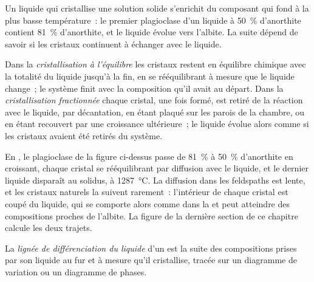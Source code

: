 Un liquide qui cristallise une solution solide s'enrichit du composant qui fond à la plus
basse température~: le premier plagioclase d'un liquide à \qty{50}{\percent} d'anorthite
contient \qty{81}{\percent} d'anorthite, et le liquide évolue vers l'albite. La suite dépend
de savoir si les cristaux continuent à échanger avec le
liquide.

\begin{definition}
\label{def:b2:magmatic-differentiation:crystallisation}
Dans la \emph{cristallisation à l'équilibre} les
cristaux restent en équilibre chimique avec la totalité du liquide jusqu'à la
fin, en se rééquilibrant à mesure que le liquide change~; le système finit avec la composition
qu'il avait au départ. Dans la \emph{cristallisation fractionnée}
chaque cristal, une fois formé, est retiré de la réaction avec le liquide, par
décantation, en étant plaqué sur les parois de la chambre, ou en étant recouvert par une
croissance ultérieure~; le liquide évolue alors comme si les cristaux avaient été retirés du
système.
\end{definition}

En , le plagioclase de la figure ci-dessus passe de
\qty{81}{\percent} à \qty{50}{\percent} d'anorthite en croissant, chaque cristal se rééquilibrant par
diffusion avec le liquide, et le dernier liquide disparaît au solidus, à
\qty{1287}{\celsius}. La diffusion dans les feldspaths est lente, et les cristaux naturels
la suivent rarement~: l'intérieur de chaque cristal est coupé du liquide, qui se comporte alors
comme dans la  et peut atteindre des compositions proches de
l'albite. La figure de la dernière section de ce chapitre calcule les deux trajets.

\begin{definition}\label{def:b2:magmatic-differentiation:lld}
La \emph{lignée de différenciation du liquide} d'un  est la
suite des compositions prises par son liquide au fur et à mesure qu'il cristallise, tracée sur un
diagramme de variation ou un diagramme de phases.
\end{definition}

